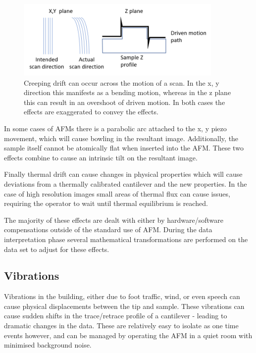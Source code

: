 \begin{figure}[h!]     %
        \begin{center}
          \includegraphics[width=100mm]{chapter2/Creep.PNG}
\end{center}
\caption{Creeping drift can occur across the motion of a scan. In the x, y direction this manifests as a bending motion, whereas in the z plane this can result in an overshoot of driven motion. In both cases the effects are exaggerated to convey the effects.}
\label{fig:Creep}                 %
\end{figure}


In some cases of AFMs there is a parabolic arc attached to the x, y piezo movement, which will cause bowling in the resultant image. Additionally, the sample itself cannot be atomically flat when inserted into the AFM. These two effects combine to cause an intrinsic tilt on the resultant image.

Finally thermal drift can cause changes in physical properties which will cause deviations from a thermally calibrated cantilever and the new properties. In the case of high resolution images small areas of thermal flux can cause issues, requiring the operator to wait until thermal equilibrium is reached.

The majority of these effects are dealt with either by hardware/software compensations outside of the standard use of AFM. During the data interpretation phase several mathematical transformations are performed on the data set to adjust for these effects.

\subsection{Vibrations}

Vibrations in the building, either due to foot traffic, wind, or even speech can cause physical displacements between the tip and sample. These vibrations can cause sudden shifts in the trace/retrace profile of a cantilever - leading to dramatic changes in the data. These are relatively easy to isolate as one time events however, and can be managed by operating the AFM in a quiet room with minimised background noise.


